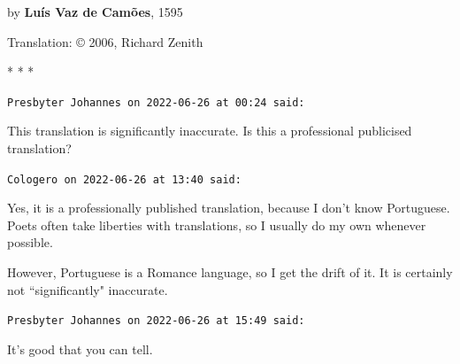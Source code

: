 \setlength{\leftmargini}{\saveleftmargini}%

by \textbf{Luís Vaz de Camões}, 1595

Translation: © 2006, Richard Zenith




\begin{center}* * *\end{center}

\begin{footnotesize}\begin{sffamily}



\texttt{Presbyter Johannes on 2022-06-26 at 00:24 said: }

This translation is significantly inaccurate. Is this a professional publicised translation?


\hfill

\texttt{Cologero on 2022-06-26 at 13:40 said: }

Yes, it is a professionally published translation, because I don't know Portuguese. Poets often take liberties with translations, so I usually do my own whenever possible.

However, Portuguese is a Romance language, so I get the drift of it. It is certainly not ``significantly" inaccurate.


\hfill

\texttt{Presbyter Johannes on 2022-06-26 at 15:49 said: }

It's good that you can tell.


\end{sffamily}\end{footnotesize}

